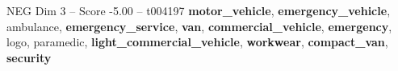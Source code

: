 \begin{textsample}{NEG Dim 3 – Score -5.00 – t004197}  \label{ex:f3_neg_026}
\textbf{motor\_vehicle}, \textbf{emergency\_vehicle}, ambulance, \textbf{emergency\_service}, \textbf{van}, \textbf{commercial\_vehicle}, \textbf{emergency}, logo, paramedic, \textbf{light\_commercial\_vehicle}, \textbf{workwear}, \textbf{compact\_van}, \textbf{security}

\end{textsample}
